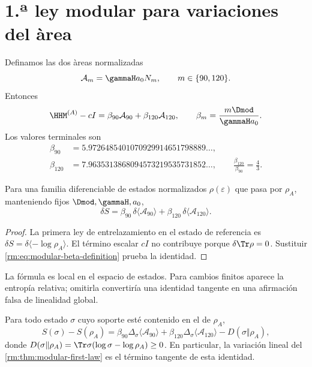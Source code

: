 \section{1.ª ley modular para variaciones del àrea}

Definamos las dos \`areas normalizadas
\begin{equation}
\label{rm:eq:modular-normalized-area-channels}
\mathcal A_m=\gammaH a_0N_m,
\qquad m\in\{90,120\}.
\end{equation}
Entonces
\begin{equation}
\label{rm:eq:modular-beta-definition}
\HHM^{(A)}-cI
=\beta_{90}\mathcal A_{90}+\beta_{120}\mathcal A_{120},
\qquad
\beta_m=\frac{m\Dmod}{\gammaH a_0}.
\end{equation}
Los valores terminales son
\begin{align}
\beta_{90}&=5.9726485401070929914651798889\ldots,
\label{rm:eq:modular-beta90}\\
\beta_{120}&=7.9635313868094573219535731852\ldots,
\qquad
\frac{\beta_{120}}{\beta_{90}}=\frac43.
\label{rm:eq:modular-beta120}
\end{align}

\begin{theorem}
\label{rm:thm:modular-first-law}
Para una familia diferenciable de estados normalizados
\(\rho(\varepsilon)\) que pasa por \(\rho_A\), manteniendo fijos
\(\Dmod,\gammaH,a_0\),
\begin{equation}
\label{rm:eq:modular-first-law}
\boxed{
\delta S
=\beta_{90}\,\delta\langle\mathcal A_{90}\rangle
+\beta_{120}\,\delta\langle\mathcal A_{120}\rangle.}
\end{equation}
\end{theorem}

\begin{proof}
La primera ley de entrelazamiento en el estado de referencia es
\(\delta S=\delta\langle-\log\rho_A\rangle\). El t\'ermino escalar
\(cI\) no contribuye porque \(\delta\Tr\rho=0\). Sustituir
\cref{rm:eq:modular-beta-definition} prueba la identidad.
\end{proof}

La f\'ormula es local en el espacio de estados. Para cambios finitos aparece
la entrop\'ia relativa; omitirla convertir\'ia una identidad tangente en una
afirmaci\'on falsa de linealidad global.

\begin{theorem}
\label{rm:thm:modular-finite-first-law}
Para todo estado \(\sigma\) cuyo soporte est\'e contenido en el de
\(\rho_A\),
\begin{equation}
\label{rm:eq:modular-finite-first-law}
\boxed{
S(\sigma)-S(\rho_A)
=\beta_{90}\Delta_\sigma\langle\mathcal A_{90}\rangle
+\beta_{120}\Delta_\sigma\langle\mathcal A_{120}\rangle
-D(\sigma\Vert\rho_A),}
\end{equation}
donde
\(D(\sigma\Vert\rho_A)=\Tr\sigma(\log\sigma-\log\rho_A)\geq0\).
En particular, la variaci\'on lineal del
\cref{rm:thm:modular-first-law} es el t\'ermino tangente de esta identidad.
\end{theorem}

